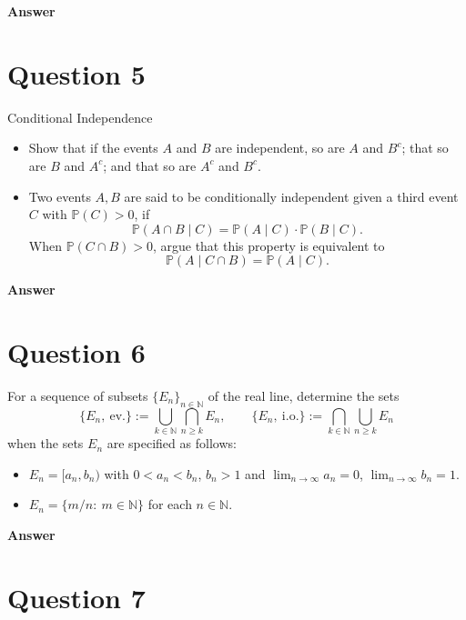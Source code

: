 \documentclass[letterpaper]{article}
\begin{document}
		\textbf{Answer}
		
		\clearpage
		
		\section{Question 5}
		
		{\color{deepred} Conditional Independence}
		
		\begin{itemize}
			\item[(i)] Show that if the events $A$ and $B$ are independent, so are $A$ and $B^{c}$; that so are $B$ and $A^{c}$; and that so are $A^{c}$ and $B^{c}$.
			
			\item[(ii)] Two events $A,B$ are said to be conditionally independent given a third event $C$ with $\mathbb{P}(C)>0$, if
			\[
			\mathbb{P}(A\cap B\mid C)=\mathbb{P}(A\mid C)\cdot \mathbb{P}(B\mid C).
			\]
			When $\mathbb{P}(C\cap B)>0$, argue that this property is equivalent to
			\[
			\mathbb{P}(A\mid C\cap B)=\mathbb{P}(A\mid C).
			\]
		\end{itemize}
		
		\textbf{Answer}
		
		\clearpage
		
		\section{Question 6}
		
		For a sequence of subsets $\{E_n\}_{n\in\mathbb{N}}$ of the real line, determine the sets
		\[
		\{E_n,\ \text{ev.}\}:=\bigcup_{k\in\mathbb{N}} \bigcap_{n\ge k} E_n,
		\qquad
		\{E_n,\ \text{i.o.}\}:=\bigcap_{k\in\mathbb{N}} \bigcup_{n\ge k} E_n
		\]
		when the sets $E_n$ are specified as follows:
		\begin{itemize}
			\item[(i)] $E_n=[a_n,b_n)$ with $0<a_n<b_n$, $b_n>1$ and $\lim_{n\to\infty} a_n=0$, $\lim_{n\to\infty} b_n=1$.
			
			\item[(ii)] $E_n=\{m/n:\ m\in\mathbb{N}\}$ for each $n\in\mathbb{N}$.
		\end{itemize}
		
		\textbf{Answer}
		
		\clearpage
		
		\section{Question 7}
		
\end{document}
